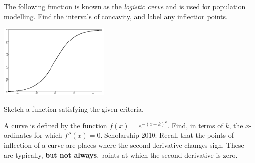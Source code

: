 \begin{questions}
  \questioA The following function is known as the \textit{logistic curve} and is used for population modelling. Find the intervals of
            concavity, and label any inflection points.
            \begin{center}
              \includegraphics[width=0.4\textwidth]{logistic}
            \end{center}
  \questioM Sketch a function satisfying the given criteria.
  \questioE A curve is defined by the function $ f(x) = e^{-(x-k)^2} $. Find, in terms of $ k $, the $ x$-ordinates for which $ f''(x) = 0 $.
  \questioS Scholarship 2010: Recall that the points of inflection of a curve are places where the second derivative
            changes sign. These are typically, \textbf{but not always}, points at which the second derivative is zero.


\end{questions}
